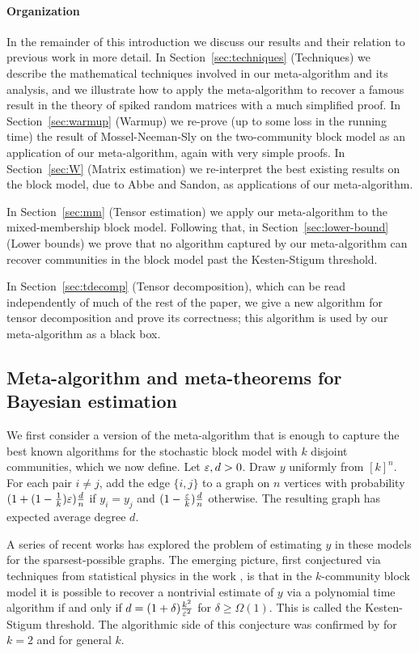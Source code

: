 \paragraph{Organization}
In the remainder of this introduction we discuss our results and their relation to previous work in more detail.
In Section~\ref{sec:techniques} (Techniques) we describe the mathematical techniques involved in our meta-algorithm and its analysis, and we illustrate how to apply the meta-algorithm to recover a famous result in the theory of spiked random matrices with a much simplified proof.
In Section~\ref{sec:warmup} (Warmup) we re-prove (up to some loss in the running time) the result of Mossel-Neeman-Sly on the two-community block model as an application of our meta-algorithm, again with very simple proofs.
In Section~\ref{sec:W} (Matrix estimation) we re-interpret the best existing results on the block model, due to Abbe and Sandon, as applications of our meta-algorithm.

In Section~\ref{sec:mm} (Tensor estimation) we apply our meta-algorithm to the mixed-membership block model.
Following that, in Section~\ref{sec:lower-bound} (Lower bounds) we prove that no algorithm captured by our meta-algorithm can recover communities in the block model past the Kesten-Stigum threshold.

In Section~\ref{sec:tdecomp} (Tensor decomposition), which can be read independently of much of the rest of the paper, we give a new algorithm for tensor decomposition and prove its correctness; this algorithm is used by our meta-algorithm as a black box.


%
%
%
%
%
%
%
%
%
%
%
%

\subsection{Meta-algorithm and meta-theorems for Bayesian estimation}
\label{sec:meta-intro}
We first consider a version of the meta-algorithm that is enough to capture the best known algorithms for the stochastic block model with $k$ disjoint communities, which we now define.
Let $\varepsilon,d > 0$.
Draw $y$ uniformly from $[k]^n$.
For each pair $i \neq j$, add the edge $\{i,j\}$ to a graph on $n$ vertices with probability $(1 + (1 - \tfrac 1k) \varepsilon) \tfrac dn$ if $y_i = y_j$ and $(1- \tfrac {\varepsilon} k) \tfrac dn$ otherwise.
The resulting graph has expected average degree $d$.

A series of recent works has explored the problem of estimating $y$ in these models for the sparsest-possible graphs.
The emerging picture, first conjectured via techniques from statistical physics in the work \cite{DBLP:journals/corr/abs-1109-3041}, is that in the $k$-community block model it is possible to recover a nontrivial estimate of $y$ via a polynomial time algorithm if and only if $d = (1 + \delta)\tfrac{k^2}{\varepsilon^2}$ for $\delta \geq \Omega(1)$.
This is called the Kesten-Stigum threshold.
The algorithmic side of this conjecture was confirmed by \cite{DBLP:conf/stoc/Massoulie14,DBLP:conf/stoc/MosselNS15} for $k=2$ and \cite{DBLP:conf/nips/AbbeS16} for general $k$.

